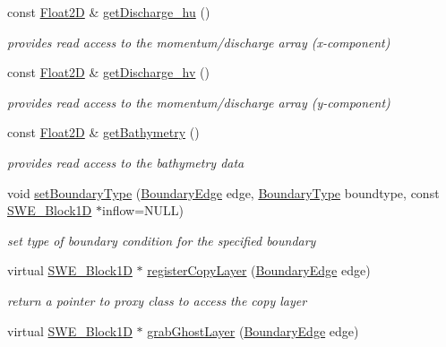 \begin{DoxyCompactItemize}
const \hyperlink{classFloat2D}{Float2\-D} \& \hyperlink{classSWE__Block_ae5e766626a1e3fee89625610e2c67f1f}{get\-Discharge\-\_\-hu} ()
\begin{DoxyCompactList}\small\item\em provides read access to the momentum/discharge array (x-\/component) \end{DoxyCompactList}\item 
const \hyperlink{classFloat2D}{Float2\-D} \& \hyperlink{classSWE__Block_aece9e8dc3f9b8ab27420e537c76daf7c}{get\-Discharge\-\_\-hv} ()
\begin{DoxyCompactList}\small\item\em provides read access to the momentum/discharge array (y-\/component) \end{DoxyCompactList}\item 
const \hyperlink{classFloat2D}{Float2\-D} \& \hyperlink{classSWE__Block_a98e2c99a335d11d09a1489d6873b5615}{get\-Bathymetry} ()
\begin{DoxyCompactList}\small\item\em provides read access to the bathymetry data \end{DoxyCompactList}\item 
void \hyperlink{classSWE__Block_aa220b93e43b10f56c72a44d7363645c1}{set\-Boundary\-Type} (\hyperlink{SWE__Scenario_8hh_aa5e01e3f7df312f7b9b0d02521141fcc}{Boundary\-Edge} edge, \hyperlink{SWE__Scenario_8hh_af75d5dd7322fa39ed0af4e7839e600f8}{Boundary\-Type} boundtype, const \hyperlink{structSWE__Block1D}{S\-W\-E\-\_\-\-Block1\-D} $\ast$inflow=N\-U\-L\-L)
\begin{DoxyCompactList}\small\item\em set type of boundary condition for the specified boundary \end{DoxyCompactList}\item 
virtual \hyperlink{structSWE__Block1D}{S\-W\-E\-\_\-\-Block1\-D} $\ast$ \hyperlink{classSWE__Block_a827ee5c61dc9c1b472ac8b4e1c19956a}{register\-Copy\-Layer} (\hyperlink{SWE__Scenario_8hh_aa5e01e3f7df312f7b9b0d02521141fcc}{Boundary\-Edge} edge)
\begin{DoxyCompactList}\small\item\em return a pointer to proxy class to access the copy layer \end{DoxyCompactList}\item 
virtual \hyperlink{structSWE__Block1D}{S\-W\-E\-\_\-\-Block1\-D} $\ast$ \hyperlink{classSWE__Block_a9a96c59444645e237d098803009158a3}{grab\-Ghost\-Layer} (\hyperlink{SWE__Scenario_8hh_aa5e01e3f7df312f7b9b0d02521141fcc}{Boundary\-Edge} edge)

\end{DoxyCompactItemize}
